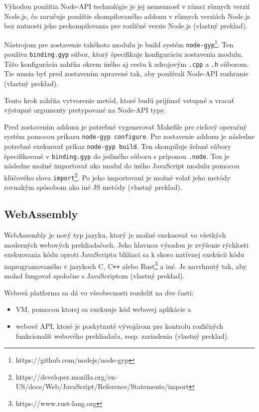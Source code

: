 Výhodou použitia Node-API technológie je jej nemennosť v rámci rôznych verzií Node.js, čo zaručuje použitie skompilovaného addonu v rôznych verziách Node.js bez nutnosti jeho prekompilovania pre rozličné verzie Node.js \cite{cpp_addons} (vlastný preklad).

Nástrojom pre zostavenie takéhoto modulu je build systém \texttt{node-gyp}\footnote{https://github.com/nodejs/node-gyp}. Ten používa \texttt{binding.gyp} súbor, ktorý špecifikuje konfiguráciu zostavenia modulu. Táto konfigurácia zahŕňa okrem iného aj cestu k zdrojovým \texttt{.cpp} a \texttt{.h} súborom. Tie musia byť pred zostavením upravené tak, aby používali Node-API rozhranie \cite{cpp_addons} (vlastný preklad).

Tento krok zahŕňa vytvorenie metód, ktoré budú prijímať vstupné a vracať výstupné argumenty pretypované na Node-API typy.

Pred zostavením addonu je potrebné vygenerovať Makefile pre cieľový operačný systém pomocou príkazu \texttt{node-gyp configure}. Pre zostavenie addonu je následne potrebné exekuovať príkaz \texttt{node-gyp build}. Ten skompiluje želané súbory špecifikované v \texttt{binding.gyp} do jediného súboru s príponou \texttt{.node}. Ten je následne možné importovať ako modul do iného JavaScript modulu pomocou kľúčového slova \texttt{import}\footnote{https://developer.mozilla.org/en-US/docs/Web/JavaScript/Reference/Statements/import}. Po jeho importovaní je možné volať jeho metódy rovnakým spôsobom ako iné JS metódy \cite{cpp_addons} (vlastný preklad).

\subsection {WebAssembly}
WebAssembly je nový typ jazyku, ktorý je možné exekuovať vo všetkých moderných webových prehliadačoch. Jeho hlavnou výsadou je zvýšenie rýchlosti exekuovania kódu oproti JavaScriptu blížiaci sa k skoro natívnej exekúcii kódu naprogramovaného v jazykoch C, C\texttt{++} alebo Rust\footnote{https://www.rust-lang.org} a iné. Je navrhnutý tak, aby mohol fungovať spoločne s JavaScriptom \cite{webassembly_concepts} (vlastný preklad).

Webová platforma sa dá vo všeobecnosti rozdeliť na dve časti:
\begin{itemize}
\item {VM, pomocou ktorej sa exekuuje kód webovej aplikácie a}
\item {webové API, ktoré je poskytnuté vývojárom pre kontrolu rozličných funkcionalít webového prehliadača, resp. zariadenia  \cite{webassembly_concepts} (vlastný preklad).}
\end{itemize}

